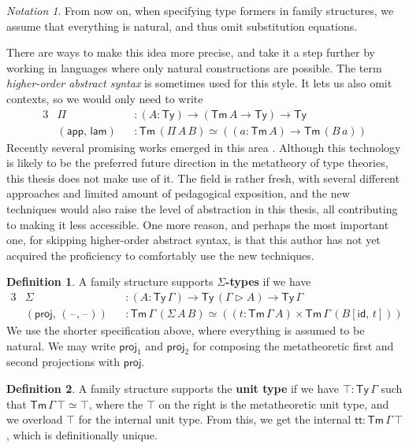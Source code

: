\documentclass[12pt,a4paper,twoside,openany]{book}
\theoremstyle{remark}
\newtheorem{notation}{Notation}
\theoremstyle{definition}
\newtheorem{mydefinition}{Definition}
\newcommand{\ms}[1]{\mathsf{#1}}
\newcommand{\id}{\mathsf{id}}
\newcommand{\Tm}{\mathsf{Tm}}
\newcommand{\Ty}{\mathsf{Ty}}
\newcommand{\proj}{\mathsf{proj}}
\renewcommand{\tt}{\mathsf{tt}}
\newcommand{\blank}{\mathord{\hspace{1pt}\text{--}\hspace{1pt}}}
\newcommand{\ext}{\triangleright}
\newcommand{\app}{\ms{app}}
\newcommand{\lam}{\ms{lam}}
\begin{document}
\begin{notation} From now on, when specifying type formers in family structures,
we assume that everything is natural, and thus omit substitution equations.
\end{notation}

There are ways to make this idea more precise, and take it a step further by
working in languages where only natural constructions are possible. The term
\emph{higher-order abstract syntax} is sometimes used for this style. It lets us
also omit contexts, so we would only need to write
\begin{alignat*}{3}
  &\Pi            &&: (A : \Ty) \to (\Tm\,A \to \Ty) \to \Ty\\
  & (\app,\,\lam) &&: \Tm\,(\Pi\,A\,B) \simeq ((a : \Tm\,A) \to \Tm\,(B\,a))
\end{alignat*}
Recently several promising works emerged in this area \cite{TODO}. Although this
technology is likely to be the preferred future direction in the metatheory of
type theories, this thesis does not make use of it. The field is rather fresh,
with several different approaches and limited amount of pedagogical exposition,
and the new techniques would also raise the level of abstraction in this thesis,
all contributing to making it less accessible. One more reason, and perhaps the
most important one, for skipping higher-order abstract syntax, is that this
author has not yet acquired the proficiency to comfortably use the new
techniques.

\begin{mydefinition}
A family structure supports \textbf{$\Sigma$-types} if we have
\begin{alignat*}{3}
  & \Sigma  &&: (A : \Ty\,\Gamma) \to \Ty\,(\Gamma\ext A) \to \Ty\,\Gamma\\
  & (\proj,\,(\blank,\blank)) &&: \Tm\,\Gamma\,(\Sigma\,A\,B) \simeq ((t : \Tm\,\Gamma\,A) \times \Tm\,\Gamma\,(B[\id,\,t]))
\end{alignat*}
We use the shorter specification above, where everything is assumed to be
natural. We may write $\proj_1$ and $\proj_2$ for composing the metatheoretic
first and second projections with $\proj$.
\end{mydefinition}

\begin{mydefinition}
A family structure supports the \textbf{unit type} if we have $\top : \Ty\,\Gamma$ such
that $\Tm\,\Gamma\,\top \simeq \top$, where the $\top$ on the right is the
metatheoretic unit type, and we overload $\top$ for the internal unit type.
From this, we get the internal $\tt : \Tm\,\Gamma\,\top$, which is
definitionally unique.
\end{mydefinition}
\end{document}
